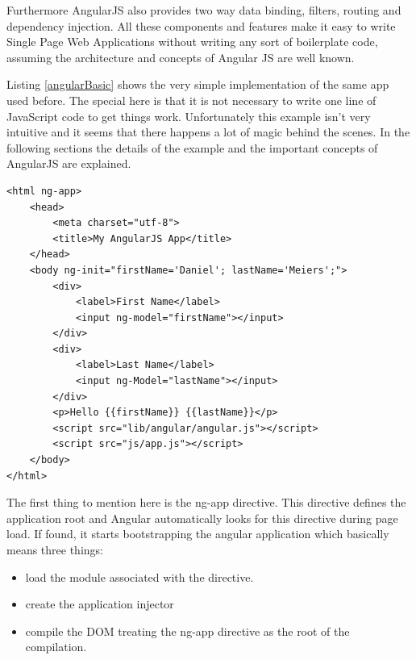 
Furthermore AngularJS also provides two way data binding, filters, routing and dependency injection.
All these components and features make it easy to write Single Page Web Applications without writing any sort of boilerplate code, assuming the architecture and concepts of Angular JS are well known.



Listing \ref{angularBasic} shows the very simple implementation of the same app used before.
The special here is that it is not necessary to write one line of JavaScript code to get things work.
Unfortunately this example isn't very intuitive and it seems that there happens a lot of magic behind the scenes.
In the following sections the details of the example and the important concepts of AngularJS are explained.

\begin{lstlisting}[label=angularBasic,caption=First Angular application]
<html ng-app>
    <head>
        <meta charset="utf-8">
        <title>My AngularJS App</title>
    </head>
    <body ng-init="firstName='Daniel'; lastName='Meiers';">
        <div>
            <label>First Name</label> 
            <input ng-model="firstName"></input>
        </div>
        <div>
            <label>Last Name</label> 
            <input ng-Model="lastName"></input>
        </div>
        <p>Hello {{firstName}} {{lastName}}</p>
        <script src="lib/angular/angular.js"></script>
        <script src="js/app.js"></script>
    </body>
</html>
\end{lstlisting}

The first thing to mention here is the ng-app directive.
This directive defines the application root and Angular automatically looks for this directive during page load.
If found, it starts bootstrapping the angular application which basically means three things:
\begin{itemize}
	\item load the module associated with the directive.
	\item create the application injector
	\item compile the DOM treating the ng-app directive as the root of the compilation.
\end{itemize}

